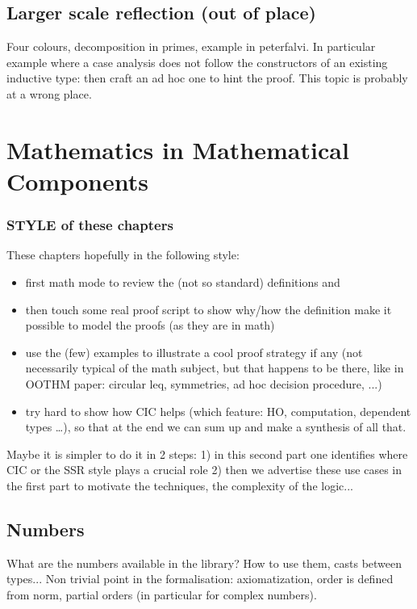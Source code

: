 \documentclass{book}
\begin{document}
\chapter{Larger scale reflection (out of place)}
Four colours, decomposition in primes, example in peterfalvi. In
particular example where a case analysis does not follow the
constructors of an existing inductive type: then craft an ad hoc one
to hint the proof. This topic is probably at a wrong place.

\part{Mathematics in Mathematical Components}

\section{STYLE of these chapters}
These chapters hopefully in the following style:
\begin{itemize}
\item first math mode to review the (not so standard) definitions and
\item then touch some real proof script to show why/how the definition
  make it possible to model the proofs (as they are in math)
\item use the (few) examples to illustrate a cool proof strategy if
  any (not necessarily typical of the math subject, but that happens to
  be there, like in OOTHM paper: circular leq, symmetries, ad hoc
  decision procedure, ...)
\item try hard to show how CIC helps (which feature: HO, computation, dependent
	types \ldots), so that at the end we can sum up and make a synthesis of
	all that.
\end{itemize}

Maybe it is simpler to do it in 2 steps:
1) in this second part one identifies where CIC or the SSR style plays a
   crucial role
2) then we advertise these use cases in the first part to motivate
   the techniques, the complexity of the logic...

\chapter{Numbers}

What are the numbers available in the library? How to use them, casts
between types... Non trivial point in the formalisation:
axiomatization, order is defined from norm, partial orders (in
particular for complex numbers).
\end{document}
